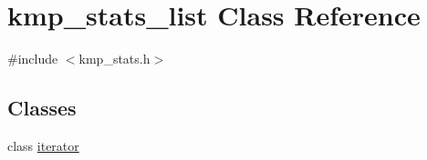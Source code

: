 \hypertarget{classkmp__stats__list}{\section{kmp\-\_\-stats\-\_\-list Class Reference}
\label{classkmp__stats__list}
}


{\ttfamily \#include $<$kmp\-\_\-stats.\-h$>$}

\subsection*{Classes}
\begin{DoxyCompactItemize}
\item 
class \hyperlink{classkmp__stats__list_1_1iterator}{iterator}
\end{DoxyCompactItemize}
